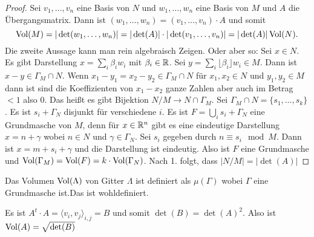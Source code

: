 \begin{proof}
	Sei \(v_1,\dots,v_n\) eine Basis von \(N\) und \(w_1,\dots,w_n\) eine Basis von \(M\) und \(A\) die Übergangsmatrix.
	Dann ist \((w_1,\dots,w_n)=(v_1,\dots,v_n)\cdot A\) und somit
	\[\operatorname{Vol}(M)=|\det(w_1,\dots,w_n)|=|\det(A)|\cdot |\det(v_1,\dots,v_n)|=|\det(A)|\operatorname{Vol}(N).\]
	Die zweite Aussage kann man rein algebraisch Zeigen. Oder aber so:
	Sei \(x\in N\). Es gibt Darstellung \(x=\sum_i \beta_iw_i\) mit \(\beta_i\in\mathbb{R}\). Sei \(y=\sum_i\lfloor \beta_i \rfloor w_i\in M\).
	Dann ist \(x-y\in \Gamma_M\cap N\).
	Wenn \(x_1-y_1=x_2-y_2\in \Gamma_M\cap N\) für \(x_1,x_2\in N\) und \(y_1,y_2\in M\) dann ist 
	sind die Koeffizienten von \(x_1-x_2\) ganze Zahlen aber auch im Betrag \(<1\) also 0.
	Das heißt es gibt Bijektion \(N/M\to N\cap \Gamma_M\).
	Sei \(\Gamma_M\cap N=\{s_1,\dots,s_k\}\). 
	Es ist \(s_i+\Gamma_N\) disjunkt für verschiedene \(i\).
	Es ist \(F=\bigcup_i s_i+\Gamma_N\) eine Grundmasche von \(M\), denn für \(x\in \mathbb{R}^n\) gibt es eine eindeutige Darstellung \(x=n+\gamma\) wobei \(n\in N\) und \(\gamma\in \Gamma_N\). Sei \(s_i\) gegeben durch \(n\equiv s_i \mod M\). Dann ist \(x=m+s_i+\gamma\) und die Darstellung ist eindeutig.
	Also ist \(F\) eine Grundmasche und \(\operatorname{Vol}(\Gamma_M)=\operatorname{Vol}(F)=k\cdot\operatorname{Vol}(\Gamma_N)\).
	Nach 1. folgt, dass \(|N/M|=|\det(A)|\)
	
\end{proof}
\begin{Def}
	Das Volumen \(\operatorname{Vol}(\Lambda)\) von Gitter \(\Lambda\) ist definiert als \(\mu(\Gamma)\) wobei \(\Gamma\) eine Grundmasche ist.Das ist wohldefiniert.
	
\end{Def}
\begin{Bem}
	Es ist \(A^t\cdot A=\langle v_i,v_j\rangle_{i,j}=B\)
	und somit \(\det(B)=\det(A)^2\).
	Also ist \(\operatorname{Vol}(A)=\sqrt{\det(B)}\)
\end{Bem}
